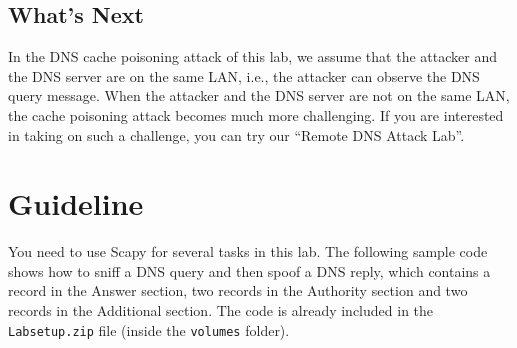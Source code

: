 \subsection{What's Next}


In the DNS cache poisoning attack of this lab, 
we assume that the attacker and the DNS server are on
the same LAN, i.e., the attacker can observe the DNS query message.
When the attacker and the DNS server are not on the same LAN,
the cache poisoning attack becomes much more challenging. If you
are interested in taking on such a challenge, you can 
try our ``Remote DNS Attack Lab''.




\section{Guideline}
\label{sec:guideline}


You need to use Scapy for several tasks in this lab. The following sample code shows how to
sniff a DNS query and then spoof a DNS reply, which contains 
a record in the Answer section, two records in the Authority section and two
records in the Additional section. The code is already included 
in the \texttt{Labsetup.zip} file (inside the \texttt{volumes} folder).  


